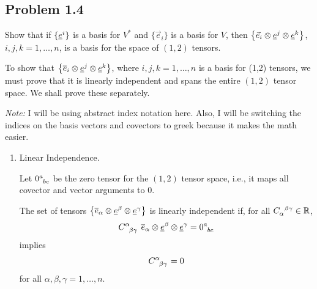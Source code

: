 	\subsection*{
		Problem 1.4
	}
	\begin{problem}
		Show that if $\{\underline{e}^i\}$ is a basis for $V^*$ and 
		$\{\vec{e}_i\}$ is a basis for $V$, then $\qty{\vec{e}_i\otimes \underline{e}^j \otimes \underline{e}^k}$, $i,j,k = 1,\ldots,n$, is 
		a basis for the space of $(1,2)$ tensors.
	\end{problem}
	\begin{solution_pset}
		
		To show that $\qty{\overline{e}_i \otimes \underline{e}^j \otimes \underline{e}^k}$, where $i,j,k=1,\ldots, n$
		is a basis for (1,2) tensors, we must prove that
		it is linearly independent and spans the entire $(1,2)$ tensor space.
		We shall prove these separately.

		\textit{Note:} I will be using abstract index notation here. Also, I will be switching the indices on the basis vectors and covectors to greek because it makes the math easier.

		\begin{enumerate}[(1)]
		    \item Linear Independence.


				Let $0\indices{^{a}_{bc}}$ be the zero tensor for the
				$(1,2)$ tensor space, i.e., it maps all covector and vector
				arguments to $0$.

				The set of tensors $
					\qty{
						\overline{e}_\alpha \otimes \underline{e}^\beta \otimes \underline{e}^\gamma
					}
				$ is linearly independent
				if, for all $C\indices{_\alpha^{\beta\gamma}}\in\R$,
				\[
					C\indices{^\alpha_{\beta\gamma}}\ 
					\ovr e_\alpha \otimes \und e^\beta \otimes \und e^\gamma
					=
					0\indices{^{a}_{bc}}
				\]
				implies
				\[
					C\indices{^\alpha_{\beta\gamma}}=0
				\]
				for all $\alpha,\beta,\gamma=1,\ldots,n$.


\end{enumerate}
\end{solution_pset}

